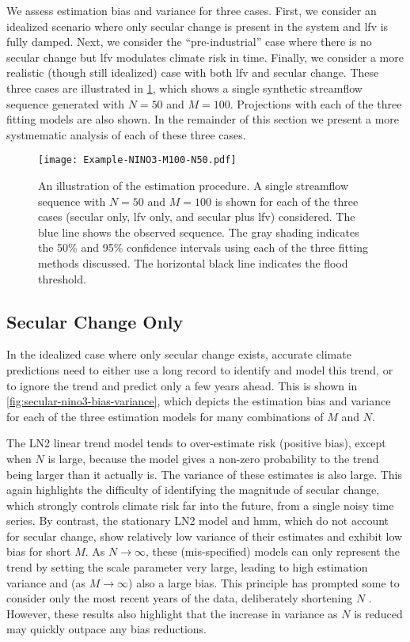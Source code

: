 \documentclass[
  draft,
  linenumbers
]{agujournal2018}
\makeatletter
\newcommand{\ie}{i.e.\@\xspace}
\makeatother
\begin{document}
We assess estimation bias and variance for three cases.
First, we consider an idealized scenario where only secular change is present in the system and \gls{lfv} is fully damped.
Next, we consider the ``pre-industrial'' case where there is no secular change but \gls{lfv} modulates climate risk in time.
Finally, we consider a more realistic (though still idealized) case with both \gls{lfv} and secular change.
These three cases are illustrated in \cref{fig:example-fit}, which shows a single synthetic streamflow sequence generated with $N=50$ and $M=100$.
Projections with each of the three fitting models are also shown.
In the remainder of this section we present a more systmematic analysis of each of these three cases.
\begin{figure}
  \texttt{[image: Example-NINO3-M100-N50.pdf]}
  \caption{
    An illustration of the estimation procedure.
    A single streamflow sequence with $N=50$ and $M=100$ is shown for each of the three cases (secular only, \gls{lfv} only, and secular plus \gls{lfv}) considered.
    The blue line shows the observed sequence.
    The gray shading indicates the 50\% and 95\% confidence intervals using each of the three fitting methods discussed.
    The horizontal black line indicates the flood threshold.
  }\label{fig:example-fit}
\end{figure}

\subsection{Secular Change Only}

In the idealized case where only secular change exists, accurate climate predictions need to either use a long record to identify and model this trend, or to ignore the trend and predict only a few years ahead.
This is shown in \cref{fig:secular-nino3-bias-variance}, which depicts the estimation bias and variance for each of the three estimation models for many combinations of $M$ and $N$.

The LN2 linear trend model tends to over-estimate risk (positive bias), except when $N$ is large, because the model gives a non-zero probability to the trend being larger than it actually is.
The variance of these estimates is also large.
This again highlights the difficulty of identifying the magnitude of secular change, which strongly controls climate risk far into the future, from a single noisy time series.
By contrast, the stationary LN2 model and \gls{hmm}, which do not account for secular change, show relatively low variance of their estimates and exhibit low bias for short $M$.
As $N \rightarrow \infty$, these (mis-specified) models can only represent the trend by setting the scale parameter very large, leading to high estimation variance and (as $M \rightarrow \infty$) also a large bias.
This principle has prompted some to consider only the most recent years of the data, deliberately shortening $N$ \citep[\ie,][]{Muller:2014fc}.
However, these results also highlight that the increase in variance as $N$ is reduced may quickly outpace any bias reductions.
\end{document}
